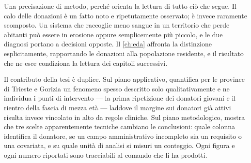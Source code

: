Una precisazione di metodo, perché orienta la lettura di tutto ciò che segue.
Il calo delle donazioni è un fatto noto e ripetutamente osservato; è invece
raramente scomposto. Un sistema che raccoglie meno sangue in un territorio che
perde abitanti può essere in erosione oppure semplicemente più piccolo, e le
due diagnosi portano a decisioni opposte. Il \cref{ch:eda} affronta la
distinzione esplicitamente, rapportando le donazioni alla popolazione
residente, e il risultato che ne esce condiziona la lettura dei capitoli
successivi.

Il contributo della tesi è duplice. Sul piano applicativo, quantifica per le
province di Trieste e Gorizia un fenomeno spesso descritto solo
qualitativamente e ne individua i punti
di intervento --- la prima ripetizione dei donatori giovani e il rientro della
fascia di mezza età --- laddove il margine sui donatori già attivi risulta
invece vincolato in alto da regole cliniche. Sul piano metodologico, mostra che
tre scelte apparentemente tecniche cambiano le conclusioni: quale colonna
identifica il donatore, se un campo amministrativo incompleto sia un requisito
o una covariata, e su quale unità di analisi si misuri un conteggio. Ogni
figura e ogni numero riportati sono tracciabili al comando che li ha prodotti.
